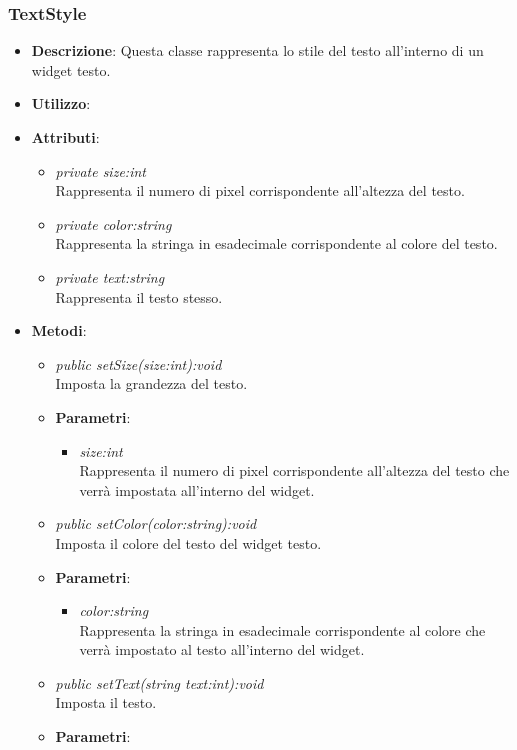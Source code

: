 \subsubsection{TextStyle}
\begin{itemize}
\item \textbf{Descrizione}: Questa classe rappresenta lo stile del testo all'interno di un widget testo.
\item \textbf{Utilizzo}:
\item \textbf{Attributi}:
	\begin{itemize}
	\item \textit{private size:int}\\
	Rappresenta il numero di pixel corrispondente all'altezza del testo.
	\item \textit{private color:string}\\
	Rappresenta la stringa in esadecimale corrispondente al colore del testo.
	\item \textit{private text:string}\\
	Rappresenta il testo stesso. 
	\end{itemize}
\item \textbf{Metodi}:
	\begin{itemize}
	\item \textit{public setSize(size:int):void}\\
	Imposta la grandezza del testo.
		\item{\textbf{Parametri}: \begin{itemize}
		\item \textit{size:int}\\
		Rappresenta il numero di pixel corrispondente all'altezza del testo che verrà impostata all'interno del widget.
		\end{itemize}}
	\item \textit{public setColor(color:string):void}\\
	Imposta il colore del testo del widget testo.
		\item{\textbf{Parametri}: \begin{itemize}
		\item \textit{color:string}\\
		Rappresenta la stringa in esadecimale corrispondente al colore che verrà impostato al testo all'interno del widget.
		\end{itemize}}
	\item \textit{public setText(string text:int):void}\\
	Imposta il testo.
		\item{\textbf{Parametri}: \begin{itemize}

\end{itemize}}
\end{itemize}
\end{itemize}
